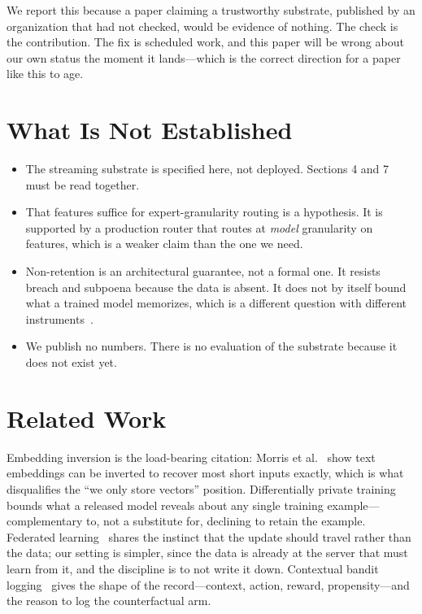 \documentclass[11pt,a4paper]{article}
\begin{document}
We report this because a paper claiming a trustworthy substrate, published by an
organization that had not checked, would be evidence of nothing. The check is the
contribution. The fix is scheduled work, and this paper will be wrong about our own status
the moment it lands---which is the correct direction for a paper like this to age.

\section{What Is Not Established}

\begin{itemize}
  \item The streaming substrate is specified here, not deployed. Sections 4 and 7 must be
        read together.
  \item That features suffice for expert-granularity routing is a hypothesis. It is
        supported by a production router that routes at \emph{model} granularity on
        features, which is a weaker claim than the one we need.
  \item Non-retention is an architectural guarantee, not a formal one. It resists
        breach and subpoena because the data is absent. It does not by itself bound what a
        trained model memorizes, which is a different question with different
        instruments~\cite{dpsgd}.
  \item We publish no numbers. There is no evaluation of the substrate because it does not
        exist yet.
\end{itemize}

\section{Related Work}

Embedding inversion is the load-bearing citation: Morris et al.~\cite{vec2text} show text
embeddings can be inverted to recover most short inputs exactly, which is what disqualifies
the ``we only store vectors'' position. Differentially private
training~\cite{dpsgd} bounds what a released model reveals about any single training
example---complementary to, not a substitute for, declining to retain the example.
Federated learning~\cite{fedavg} shares the instinct that the update should travel rather
than the data; our setting is simpler, since the data is already at the server that must
learn from it, and the discipline is to not write it down. Contextual bandit
logging~\cite{bandit} gives the shape of the record---context, action, reward,
propensity---and the reason to log the counterfactual arm.
\end{document}
